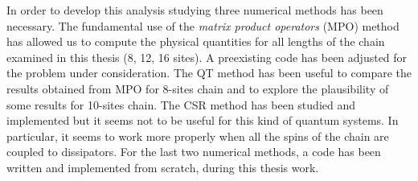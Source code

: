 \documentclass[12pt]{extarticle}
\begin{document}
In order to develop this analysis studying three numerical methods has been necessary. The fundamental use of the \emph{matrix product operators} (MPO) method has allowed us to compute the physical quantities for all lengths of the chain examined in this thesis (8, 12, 16 sites). A preexisting code has been adjusted for the problem under consideration. The QT method has been useful to compare the results obtained from MPO for 8-sites chain and to explore the plausibility of some results for 10-sites chain. The CSR method has been studied and implemented but it seems not to be useful for this kind of quantum systems. In particular, it seems to work more properly when all the spins of the chain are coupled to dissipators. For the last two numerical methods, a code has been written and implemented from scratch, during this thesis work.










\end{document}
